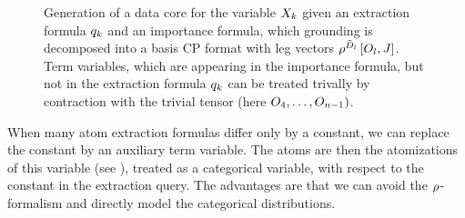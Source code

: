 


\begin{figure}[h]
    \begin{center}
        
    \end{center}
    \caption{Generation of a data core for the variable $X_{k}$ given an extraction formula $q_{k}$ and an importance formula, which grounding is decomposed into a basis CP format with leg vectors $\rho^{\tilde{D}_{l}}\left[O_{l},J\right]$.
    Term variables, which are appearing in the importance formula, but not in the extraction formula $q_{k}$ can be treated trivally by contraction with the trivial tensor (here $O_{4},\ldots,O_{n-1})$.
    }
    \label{fig:datacoreGeneration}
\end{figure}


When many atom extraction formulas differ only by a constant, we can replace the constant by an auxiliary term variable.
The atoms are then the atomizations of this variable (see ), treated as a categorical variable, with respect to the constant in the extraction query.
The advantages are that we can avoid the $\rho^{}$-formalism and directly model the categorical distributions.

